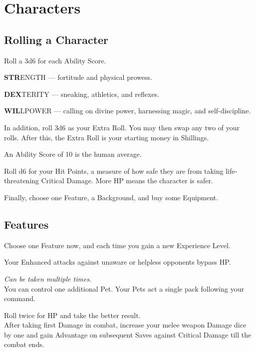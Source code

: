 \documentclass[itdr]{subfiles}
\begin{document}
\chapter{Characters}
\label{ch:characters}
\resetHeaders

\section{Rolling a Character}

Roll a 3d6 for each Ability Score.

\textbf{STR}ENGTH --- fortitude and physical prowess.

\textbf{DEX}TERITY --- sneaking, athletics, and reflexes.

\textbf{WIL}LPOWER --- calling on divine power, harnessing magic, and self-discipline.

In addition, roll 3d6 as your Extra Roll. You may then swap any two of your rolls. After this, the Extra Roll is your starting money in Shillings.

An Ability Score of 10 is the human average.

Roll d6 for your Hit Points, a measure of how safe they are from taking life-threatening Critical \mbox{Damage}. More HP means the character is safer.

Finally, choose one Feature, a Background, and buy some Equipment.

\section{Features}

Choose one Feature now, and each time you gain a new Experience Level.

\vfill
{}
Your Enhanced attacks against unaware or helpless opponents bypass HP.

\vfill
{} {\slshape Can be taken multiple times.}\\
You can control one additional Pet. Your Pets act a single pack following your command.

\vfill
{} Roll twice for HP and take the better result.\\
After taking first Damage in combat, increase your melee weapon Damage dice by one and gain Advantage on subsequent Saves against Critical Damage till the combat ends.
\end{document}
